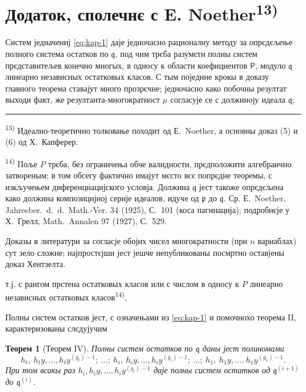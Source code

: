 \documentclass[11pt]{article}
\newcommand{\foreign}[1]{#1}
\theoremstyle{plain}
\newtheorem{satz}{Теорем}
\begin{document}
\newpage
\section*{Додаток, сполечнє с E. Noether\textsuperscript{13)}}

Систем једначениј \eqref{eq:kap-1} даје једночасно рационалну
методу за опрєдєљење полного система остатков по $\mathfrak{q}$,
под чим трєба разумєти полны систем прєдставитељев конечно многых,
в односу к области коефициентов $\mathsf{P}$, модуло $\mathfrak{q}$ линеарно
независных остатковых класов. С тым поједине крокы в доказу
главного теорема ставајут много прозрєчне; једночасно како
побочны резултат выходи факт, же резултанта-многократност $\mu$
согласује се с должиноју идеала $\mathfrak{q}$;

\vspace{0.5em}
\noindent\rule{\textwidth}{0.4pt}
\vspace{0.3em}

{\footnotesize
\textsuperscript{13)} Идеално-теоретично толковање походит од Е.\ Noether, а основны
доказ (5) и (6) од Х.\ Капферер.

\textsuperscript{14)} Поље $P$ трєба, без ограничења обче валидности, прєдположити
алгебраично затвореным; в том обсегу фактично имајут мєсто всє попрєдне
теоремы, с изкључењем диференциацијского условја. Должина
$\mathfrak{q}$ јест такоже опрєдєљена како должина композицијној
серије идеалов, идуче од $\mathfrak{p}$ до $\mathfrak{q}$. Ср.
Е.\ Noether, \foreign{Jahresber.\ d.\ d.\ Math.-Ver.} 34 (1925), С.~101
(коса пагинација); подробнєје у Х.\ Грелл, \foreign{Math.\ Annalen} 97
(1927), С.~529.

Доказы в литератури за согласје обојих чисел многократности (при
$n$ вариаблах) сут зело сложне; најпростєјши јест јешче непубликованы
посмртно оставјены доказ Хентзелта.
}

\vspace{1em}
т.ј. с рангом прстена остатковых класов или с числом в односу к $P$
линеарно независных остатковых класов\textsuperscript{14)}.

Полны систем остатков јест, с означењами из \eqref{eq:kap-1} и
помочнохо теорема II, карактеризованы слєдујучим

\begin{satz}[Теорем IV]\label{satz:kap-IV}
Полны систем остатков по $\mathfrak{q}$ даны јест полиномами
\[
h_{t},\ h_{t}y,\ldots,h_{t}y^{(g_{t})-1};\ \ldots;\
h_{i},\ h_{i}y,\ldots,h_{i}y^{(g_{i})-1};\ \ldots;\
h_{1},\ h_{1}y,\ldots.\ h_{1}y^{(g_{1})-1}.
\]
При том всакы раз
$h_{i}, h_{i}y, \ldots, h_{i}y^{(g_{i})-1}$ даје полны
систем остатков од $\mathfrak{q}^{(i+1)}$ до
$\mathfrak{q}^{(i)}$.
\end{satz}
\end{document}
